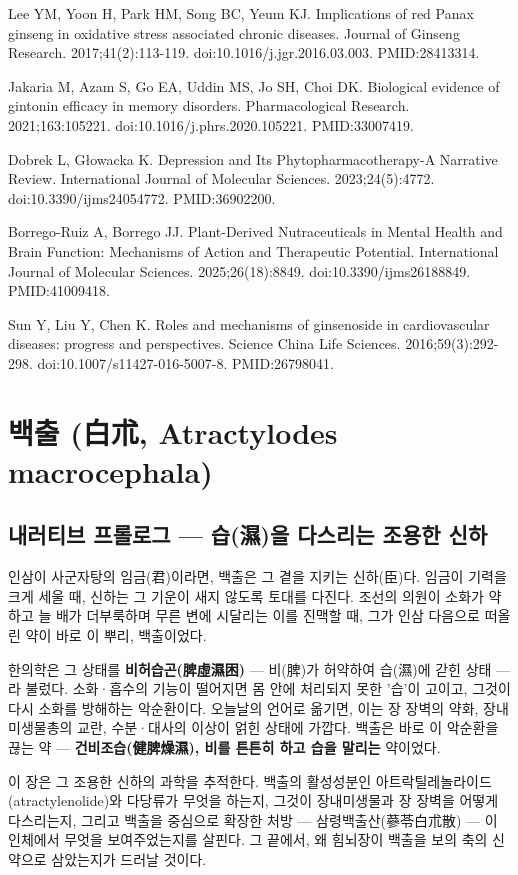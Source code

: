 \documentclass[11pt,oneside]{book}
\newcommand{\refend}{\endgroup\par}
\newcommand{\reff}[2]{\par\hangindent=7mm\hangafter=1\noindent[#1]\hspace{2mm}#2\par}
\begin{document}
\reff{66}{Lee YM, Yoon H, Park HM, Song BC, Yeum KJ. Implications of red Panax ginseng in oxidative stress associated chronic diseases. Journal of Ginseng Research. 2017;41(2):113-119. doi:10.1016/j.jgr.2016.03.003. PMID:28413314.}
\reff{67}{Jakaria M, Azam S, Go EA, Uddin MS, Jo SH, Choi DK. Biological evidence of gintonin efficacy in memory disorders. Pharmacological Research. 2021;163:105221. doi:10.1016/j.phrs.2020.105221. PMID:33007419.}
\reff{68}{Dobrek L, Głowacka K. Depression and Its Phytopharmacotherapy-A Narrative Review. International Journal of Molecular Sciences. 2023;24(5):4772. doi:10.3390/ijms24054772. PMID:36902200.}
\reff{69}{Borrego-Ruiz A, Borrego JJ. Plant-Derived Nutraceuticals in Mental Health and Brain Function: Mechanisms of Action and Therapeutic Potential. International Journal of Molecular Sciences. 2025;26(18):8849. doi:10.3390/ijms26188849. PMID:41009418.}
\reff{70}{Sun Y, Liu Y, Chen K. Roles and mechanisms of ginsenoside in cardiovascular diseases: progress and perspectives. Science China Life Sciences. 2016;59(3):292-298. doi:10.1007/s11427-016-5007-8. PMID:26798041.}
\refend


\chapter{백출 (白朮, Atractylodes macrocephala)}

\section{내러티브 프롤로그 — 습(濕)을 다스리는 조용한 신하}
인삼이 사군자탕의 임금(君)이라면, 백출은 그 곁을 지키는 신하(臣)다. 임금이 기력을 크게 세울 때, 신하는 그 기운이 새지 않도록 토대를 다진다. 조선의 의원이 소화가 약하고 늘 배가 더부룩하며 무른 변에 시달리는 이를 진맥할 때, 그가 인삼 다음으로 떠올린 약이 바로 이 뿌리, 백출이었다.

한의학은 그 상태를 \textbf{비허습곤(脾虛濕困)} — 비(脾)가 허약하여 습(濕)에 갇힌 상태 — 라 불렀다. 소화·흡수의 기능이 떨어지면 몸 안에 처리되지 못한 '습'이 고이고, 그것이 다시 소화를 방해하는 악순환이다. 오늘날의 언어로 옮기면, 이는 장 장벽의 약화, 장내미생물총의 교란, 수분·대사의 이상이 얽힌 상태에 가깝다. 백출은 바로 이 악순환을 끊는 약 — \textbf{건비조습(健脾燥濕), 비를 튼튼히 하고 습을 말리는} 약이었다.

이 장은 그 조용한 신하의 과학을 추적한다. 백출의 활성성분인 아트락틸레놀라이드(atractylenolide)와 다당류가 무엇을 하는지, 그것이 장내미생물과 장 장벽을 어떻게 다스리는지, 그리고 백출을 중심으로 확장한 처방 — 삼령백출산(蔘苓白朮散) — 이 인체에서 무엇을 보여주었는지를 살핀다. 그 끝에서, 왜 힘뇌장이 백출을 보의 축의 신약으로 삼았는지가 드러날 것이다.
\end{document}
